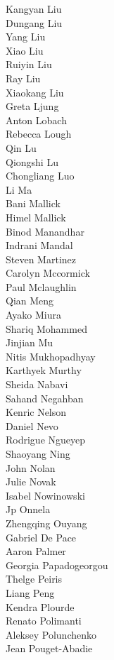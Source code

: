 Kangyan Liu\\
Dungang Liu\\
Yang Liu\\
Xiao Liu\\
Ruiyin Liu\\
Ray Liu\\
Xiaokang  Liu\\
Greta Ljung\\
Anton Lobach\\
Rebecca Lough\\
Qin Lu\\
Qiongshi Lu\\
Chongliang Luo\\
Li Ma\\
Bani Mallick\\
Himel Mallick\\
Binod Manandhar\\
Indrani Mandal\\
Steven  Martinez\\
Carolyn Mccormick\\
Paul Mclaughlin\\
Qian Meng\\
Ayako Miura\\
Shariq Mohammed\\
Jinjian Mu\\
Nitis Mukhopadhyay\\
Karthyek Murthy\\
Sheida Nabavi\\
Sahand Negahban\\
Kenric Nelson\\
Daniel Nevo\\
Rodrigue Ngueyep\\
Shaoyang Ning\\
John Nolan\\
Julie Novak\\
Isabel Nowinowski\\
Jp Onnela\\
Zhengqing Ouyang\\
Gabriel De Pace\\
Aaron Palmer\\
Georgia Papadogeorgou\\
Thelge Peiris\\
Liang Peng\\
Kendra Plourde\\
Renato Polimanti\\
Aleksey Polunchenko\\
Jean Pouget-Abadie\\
